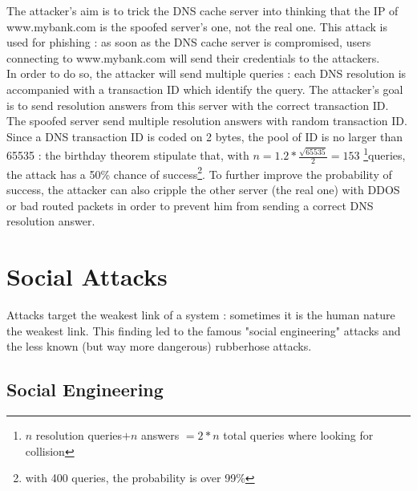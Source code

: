 The attacker's aim is to trick the DNS cache server into thinking that the IP of www.mybank.com is the spoofed server's one, not the real one. This attack is used for phishing : as soon as the DNS cache server is compromised, users connecting to www.mybank.com will send their credentials to the attackers. \\
In order to do so, the attacker will send multiple queries : each DNS resolution is accompanied with a transaction ID which identify the query. The attacker's goal is to send resolution answers from this server with the correct transaction ID. The spoofed server send multiple resolution answers with random transaction ID. Since a DNS transaction ID is coded on 2 bytes, the pool of ID is no larger than 65535 : the birthday theorem stipulate that, with $n = 1.2 * \frac{\sqrt{65535}}{2}  = 153$  \footnote{ $n$ resolution queries$ + n$ answers $= 2*n$ total queries where looking for collision }queries, the attack has a 50\% chance of success\footnote{with 400 queries, the probability is over 99\%}. To further improve the probability of success, the attacker can also cripple the other server (the real one) with DDOS or bad routed packets in order to prevent him from sending a correct DNS resolution answer.

\section{Social Attacks}

Attacks target the weakest link of a system : sometimes it is the human nature the weakest link. This finding led to the famous "social engineering" attacks and the less known (but way more dangerous) rubberhose attacks.

\subsection{Social Engineering}

